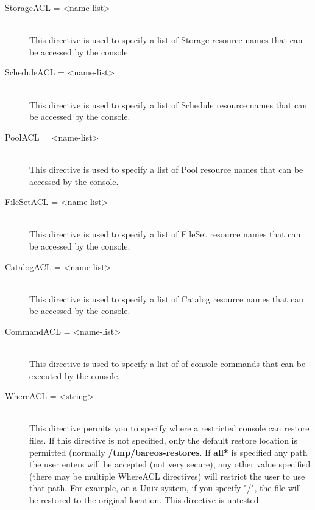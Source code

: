 \begin{description}
\item [StorageACL = {\textless}name-list{\textgreater}] \hfill \\
This directive is used to  specify a list of Storage resource names that can
be accessed by  the console.

\item [ScheduleACL = {\textless}name-list{\textgreater}] \hfill \\
This directive is used to  specify a list of Schedule resource names that can
be accessed by the console.

\item [PoolACL = {\textless}name-list{\textgreater}] \hfill \\
This directive is used to  specify a list of Pool resource names that can be
accessed by the console.

\item [FileSetACL = {\textless}name-list{\textgreater}] \hfill \\
This directive is used to specify a list of FileSet resource names that
can be accessed by the console.

\item [CatalogACL = {\textless}name-list{\textgreater}] \hfill \\
This directive is used to specify a list of Catalog resource names that
can be accessed by the console.

\item [CommandACL = {\textless}name-list{\textgreater}] \hfill \\
This directive is used to specify a list of of console commands that can
be executed by the console.

\item [WhereACL = {\textless}string{\textgreater}] \hfill \\
This directive permits you to specify where a restricted console
can restore files. If this directive is not specified, only the
default restore location is permitted (normally {\bf
/tmp/bareos-restores}. If {\bf *all*} is specified any path the
user enters will be accepted (not very secure), any other
value specified (there may be multiple WhereACL directives) will
restrict the user to use that path. For example, on a Unix system,
if you specify "/", the file will be restored to the original
location.  This directive is untested.

\end{description}

